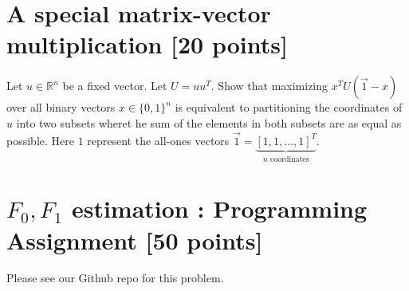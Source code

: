 \section{A special matrix-vector multiplication [20 points]} 


Let $u \in \mathbb{R}^n$ be a fixed vector. Let $U = uu^T$. Show that maximizing $x^T U(\vec{1}-x)$ over all binary vectors $x \in \{0,1\}^n$  
is equivalent to partitioning the coordinates of $u$ into two subsets wheret he sum of the elements in both subsets are as equal as possible. Here $1$ represent the all-ones vectors $\vec{1}= \underbrace{[1,1,...,1]^T}_{n \text{~coordinates}}$.
 

\section{$F_0, F_1$ estimation : Programming Assignment [50 points] } 

Please see our Github repo for this problem.

 

